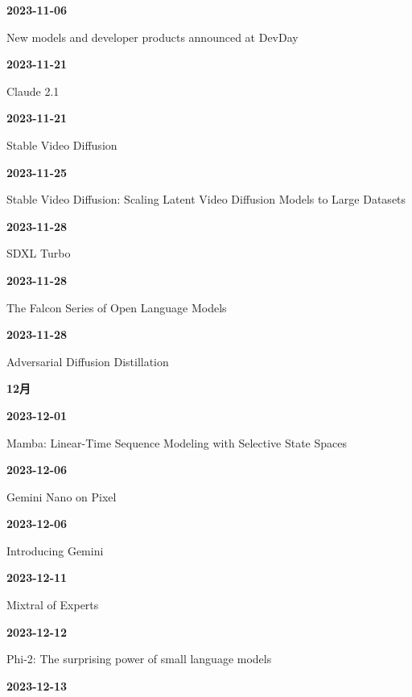 \smallskip
\noindent\textbf{2023-11-06}\par
{\raggedright New models and developer products announced at DevDay\,\cite{src-e17d0bf10781}\par}
\smallskip
\noindent\textbf{2023-11-21}\par
{\raggedright Claude 2.1\,\cite{src-013fa77665db}\par}
\smallskip
\noindent\textbf{2023-11-21}\par
{\raggedright Stable Video Diffusion\,\cite{src-0b410c70bfc7}\par}
\smallskip
\noindent\textbf{2023-11-25}\par
{\raggedright Stable Video Diffusion: Scaling Latent Video Diffusion Models to Large Datasets\,\cite{src-096341c0ccf6}\par}
\smallskip
\noindent\textbf{2023-11-28}\par
{\raggedright SDXL Turbo\,\cite{src-9da0d929aa45}\par}
\smallskip
\noindent\textbf{2023-11-28}\par
{\raggedright The Falcon Series of Open Language Models\,\cite{src-74aa7e2a7ca4}\par}
\smallskip
\noindent\textbf{2023-11-28}\par
{\raggedright Adversarial Diffusion Distillation\,\cite{src-18f22707bf78}\par}
\smallskip
\medskip
\noindent\textbf{12月}\par
\smallskip
\noindent\textbf{2023-12-01}\par
{\raggedright Mamba: Linear-Time Sequence Modeling with Selective State Spaces\,\cite{src-5dd64e15cc75}\par}
\smallskip
\noindent\textbf{2023-12-06}\par
{\raggedright Gemini Nano on Pixel\,\cite{src-db671ee1d1b8}\par}
\smallskip
\noindent\textbf{2023-12-06}\par
{\raggedright Introducing Gemini\,\cite{src-93d355bf8806}\par}
\smallskip
\noindent\textbf{2023-12-11}\par
{\raggedright Mixtral of Experts\,\cite{src-f0349196879e}\par}
\smallskip
\noindent\textbf{2023-12-12}\par
{\raggedright Phi-2: The surprising power of small language models\,\cite{src-6e61359d2fae}\par}
\smallskip
\noindent\textbf{2023-12-13}\par
